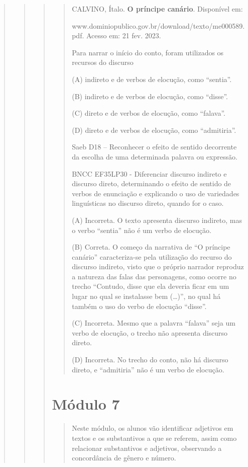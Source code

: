 \begin{quote}
\begin{quote}
\begin{quote}
\begin{quote}
CALVINO, Ítalo. \textbf{O príncipe canário}. Disponível em:

www.dominiopublico.gov.br/download/texto/me000589.pdf. Acesso em: 21
fev. 2023.

Para narrar o início do conto, foram utilizados os recursos do discurso

\protect\hypertarget{_Hlk127859316}{}{}(A) indireto e de verbos de
elocução, como ``sentia''.

(B) indireto e de verbos de elocução, como ``disse''.

(C) direto e de verbos de elocução, como ``falava''.

(D) direto e de verbos de elocução, como ``admitiria''.

Saeb D18 -- Reconhecer o efeito de sentido decorrente da escolha de uma
determinada palavra ou expressão.

BNCC EF35LP30 - Diferenciar discurso indireto e discurso direto,
determinando o efeito de sentido de verbos de enunciação e explicando o
uso de variedades linguísticas no discurso direto, quando for o caso.

(A) Incorreta. O texto apresenta discurso indireto, mas o verbo
``sentia'' não é um verbo de elocução.

(B) Correta. O começo da narrativa de ``O príncipe canário''
caracteriza-se pela utilização do recurso do discurso indireto, visto
que o próprio narrador reproduz a natureza das falas das personagens,
como ocorre no trecho ``Contudo, disse que ela deveria ficar em um lugar
no qual se instalasse bem (\ldots{})'', no qual há também o uso do verbo
de elocução ``disse''.

(C) Incorreta. Mesmo que a palavra ``falava'' seja um verbo de elocução,
o trecho não apresenta discurso direto.

(D) Incorreta. No trecho do conto, não há discurso direto, e
``admitiria'' não é um verbo de elocução.
\end{quote}

\section{Módulo 7}\label{muxf3dulo-7}

\begin{quote}
Neste módulo, os alunos vão identificar adjetivos em textos e os
substantivos a que se referem, assim como relacionar substantivos e
adjetivos, observando a concordância de gênero e número.
\end{quote}


\end{quote}
\end{quote}
\end{quote}
